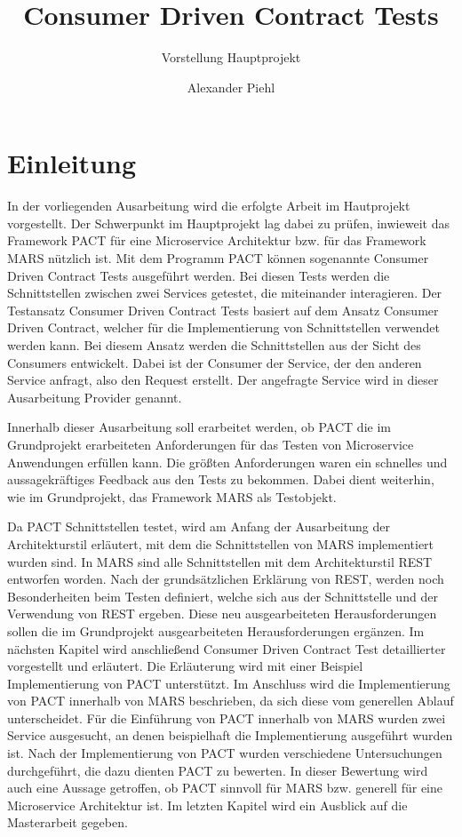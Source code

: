 \documentclass{llncs}
\title{Consumer Driven Contract Tests}
\subtitle{Vorstellung Hauptprojekt}
\author{Alexander Piehl\\\email{alexander.piehl@haw-hamburg.de}
\institute{Hamburg University of Applied Sciences,\\Dept. Computer Science, \\ Berliner Tor 7\\ 20099 Hamburg, Germany\\}}
\begin{document}
\maketitle
\section{Einleitung}
In der vorliegenden Ausarbeitung wird die erfolgte Arbeit im Hautprojekt vorgestellt. Der Schwerpunkt im Hauptprojekt lag dabei zu prüfen, inwieweit das Framework PACT für eine Microservice Architektur bzw. für das Framework MARS nützlich ist. Mit dem Programm PACT können sogenannte Consumer Driven Contract Tests ausgeführt werden. Bei diesen Tests werden die Schnittstellen zwischen zwei Services getestet, die miteinander interagieren. Der Testansatz Consumer Driven Contract Tests basiert auf dem Ansatz Consumer Driven Contract, welcher für die Implementierung von Schnittstellen verwendet werden kann. Bei diesem Ansatz werden die Schnittstellen aus der Sicht des Consumers entwickelt. Dabei ist der Consumer der Service, der den anderen Service anfragt, also den Request erstellt. Der angefragte Service wird in dieser Ausarbeitung Provider genannt.

Innerhalb dieser Ausarbeitung soll erarbeitet werden, ob PACT die im Grundprojekt erarbeiteten Anforderungen für das Testen von Microservice Anwendungen erfüllen kann. Die größten Anforderungen waren ein schnelles und aussagekräftiges Feedback aus den Tests zu bekommen. Dabei dient weiterhin, wie im Grundprojekt, das Framework MARS als Testobjekt.

Da PACT Schnittstellen testet, wird am Anfang der Ausarbeitung der Architekturstil erläutert, mit dem die Schnittstellen von MARS implementiert wurden sind. In MARS sind alle Schnittstellen mit dem Architekturstil REST entworfen worden. Nach der grundsätzlichen Erklärung von REST, werden noch Besonderheiten beim Testen definiert, welche sich aus der Schnittstelle und der Verwendung von REST ergeben. Diese neu ausgearbeiteten Herausforderungen sollen die im Grundprojekt ausgearbeiteten Herausforderungen ergänzen. 
Im nächsten Kapitel wird anschließend Consumer Driven Contract Test detaillierter vorgestellt und erläutert. Die Erläuterung wird mit einer Beispiel Implementierung von PACT unterstützt. Im Anschluss wird die Implementierung von PACT innerhalb von MARS beschrieben, da sich diese vom generellen Ablauf unterscheidet. Für die Einführung von PACT innerhalb von MARS wurden zwei Service ausgesucht, an denen beispielhaft die Implementierung ausgeführt wurden ist. Nach der Implementierung von PACT wurden verschiedene Untersuchungen durchgeführt, die dazu dienten PACT zu bewerten. In dieser Bewertung wird auch eine Aussage getroffen, ob PACT sinnvoll für MARS bzw. generell für eine Microservice Architektur ist. Im letzten Kapitel wird ein Ausblick auf die Masterarbeit gegeben.
\nocite{*}
\end{document}
